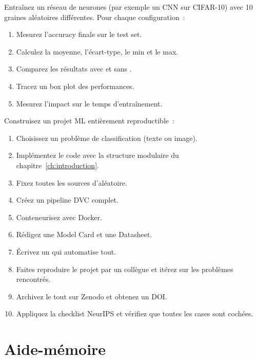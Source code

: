 \begin{exercice}
Entra\^inez un r\'eseau de neurones (par exemple un CNN sur CIFAR-10) avec
10 graines al\'eatoires diff\'erentes. Pour chaque configuration~:
\begin{enumerate}
  \item Mesurez l'accuracy finale sur le test set.
  \item Calculez la moyenne, l'\'ecart-type, le min et le max.
  \item Comparez les r\'esultats avec et sans
    .
  \item Tracez un box plot des performances.
  \item Mesurez l'impact sur le temps d'entra\^inement.
\end{enumerate}
\end{exercice}

\begin{exercice}
Construisez un projet ML enti\`erement reproductible~:
\begin{enumerate}
  \item Choisissez un probl\`eme de classification (texte ou image).
  \item Impl\'ementez le code avec la structure modulaire du
    chapitre~\ref{ch:introduction}.
  \item Fixez toutes les sources d'al\'eatoire.
  \item Cr\'eez un pipeline DVC complet.
  \item Conteneurisez avec Docker.
  \item R\'edigez une Model Card et une Datasheet.
  \item \'Ecrivez un  qui automatise tout.
  \item Faites reproduire le projet par un coll\`egue et it\'erez
    sur les probl\`emes rencontr\'es.
  \item Archivez le tout sur Zenodo et obtenez un DOI.
  \item Appliquez la checklist NeurIPS et v\'erifiez que toutes les
    cases sont coch\'ees.
\end{enumerate}
\end{exercice}

\section{Aide-m\'emoire}


